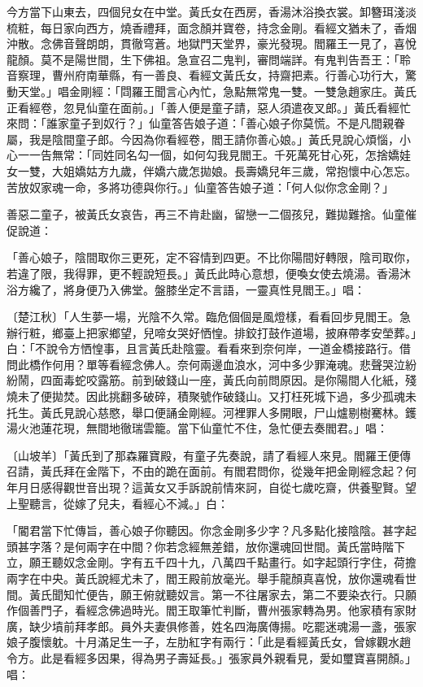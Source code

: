 \begin{showcontents}{}
今方當下山東去，四個兒女在中堂。黃氏女在西房，香湯沐浴換衣裳。卸簪珥淺淡梳粧，每日家向西方，燒香禮拜，面念顏并寶卷，持念金剛。看經文猶未了，香烟沖散。念佛音聲朗朗，貫徹穹蒼。地獄門天堂界，豪光發現。閻羅王一見了，喜悅龍顏。莫不是陽世間，生下佛祖。急宣召二鬼判，審問端詳。有鬼判告吾王：「聆音察理，曹州府南華縣，有一善良、看經文黃氏女，持齋把素。行善心功行大，驚動天堂。」唱金剛經：「閰羅王聞言心內忙，急點無常鬼一雙。一雙急趙家庄。黃氏正看經卷，忽見仙童在面前。」「善人便是童子請，惡人須遣夜叉郎。」黃氏看經忙來問：「誰家童子到奴行？」仙童答告娘子道：「善心娘子你莫慌。不是凡間親眷屬，我是陰間童子郎。今因為你看經卷，閻王請你善心娘。」黃氏見說心煩惱，小心一一告無常：「同姓同名勾一個，如何勾我見閻王。千死萬死甘心死，怎捨嬌娃女一雙，大姐嬌姑方九歲，伴嬌六歲怎拋娘。長壽嬌兒年三歲，常抱懷中心怎忘。苦放奴家魂一命，多將功德與你行。」仙童答告娘子道：「何人似你念金剛？」

善惡二童子，被黃氏女哀告，再三不肯赴幽，留戀一二個孩兒，難拋難捨。仙童催促說道：

「善心娘子，陰間取你三更死，定不容情到四更。不比你陽間好轉限，陰司取你，若違了限，我得罪，更不輕說短長。」黃氏此時心意想，便喚女使去燒湯。香湯沐浴方纔了，將身便乃入佛堂。盤膝坐定不言語，一靈真性見閻王。」唱：

〔楚江秋〕「人生夢一場，光陰不久常。臨危個個是風燈樣，看看回步見閻王。急辦行粧，鄉臺上把家鄉望，兒啼女哭好恓惶。排鉸打鼓作道場，披麻帶孝安塋葬。」白：「不說令方恓惶事，且言黃氏赴陰靈。看看來到奈何岸，一道金橋接路行。借問此橋作何用？單等看經念佛人。奈何兩邊血浪水，河中多少罪淹魂。悲聲哭泣紛紛鬧，四面毒蛇咬露筋。前到破錢山一座，黃氏向前問原因。是你陽間人化紙，殘燒未了便拋焚。因此挑翻多破碎，積聚號作破錢山。又打枉死城下過，多少孤魂未托生。黃氏見說心慈愍，舉口便誦金剛經。河裡罪人多開眼，尸山爐剔樹騫林。鑊湯火池蓮花現，無間地徹瑞雲籠。當下仙童忙不住，急忙便去奏閻君。」唱：

〔山坡羊〕「黃氏到了那森羅寶殿，有童子先奏說，請了看經人來見。閻羅王便傳召請，黃氏拜在金階下，不由的跪在面前。有閻君問你，從幾年把金剛經念起？何年月日感得觀世音出現？這黃女又手訴說前情來訶，自從七歲吃齋，供養聖賢。望上聖聽言，從嫁了兒夫，看經心不減。」白：

「閽君當下忙傳旨，善心娘子你聽因。你念金剛多少字？凡多點化接陰陰。甚字起頭甚字落？是何兩字在中間？你若念經無差錯，放你還魂回世間。黃氏當時階下立，願王聽奴念金剛。字有五千四十九，八萬四千點畫行。如字起頭行字住，荷擔兩字在中央。黃氏說經尤未了，閻王殿前放毫光。舉手龍顏真喜悅，放你還魂看世間。黃氏聞知忙便告，願王俯就聽奴言。第一不往屠家去，第二不要染衣行。只願作個善門子，看經念佛過時光。閻王取筆忙判斷，曹州張家轉為男。他家積有家財廣，缺少墳前拜孝郎。員外夫妻俱修善，姓名四海廣傳揚。吃罷迷魂湯一盞，張家娘子腹懷躭。十月滿足生一子，左肋紅字有兩行：「此是看經黃氏女，曾嫁觀水趙令方。此是看經多因果，得為男子壽延長。」張家員外親看見，愛如璽寶喜開顏。」唱：


\end{showcontents}
